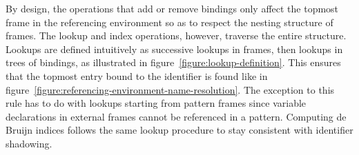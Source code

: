By design, the operations that add or remove bindings only affect the topmost frame in the referencing environment so as to respect the nesting structure of frames.
The lookup and index operations, however, traverse the entire structure.
Lookups are defined intuitively as successive lookups in frames, then lookups in trees of bindings, as illustrated in figure~\ref{figure:lookup-definition}.
This ensures that the topmost entry bound to the identifier is found like in figure~\ref{figure:referencing-environment-name-resolution}.
The exception to this rule has to do with lookups starting from pattern frames since variable declarations in external frames cannot be referenced in a pattern.
Computing de Bruijn indices follows the same lookup procedure to stay consistent with identifier shadowing.

\begin{figure}[H]
\centering
{\footnotesize
{}}
\end{figure}
